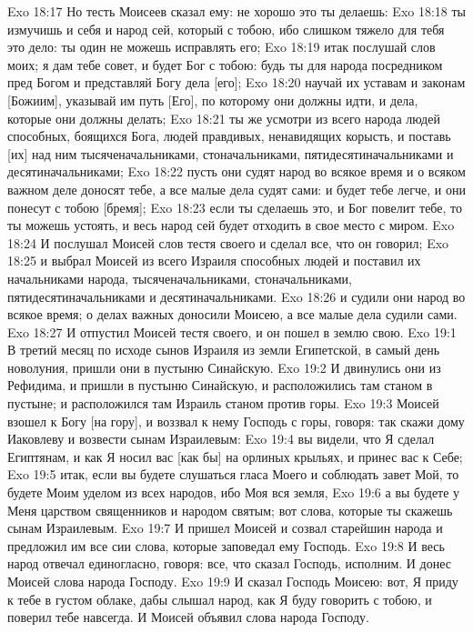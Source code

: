 Exo 18:17  Но тесть Моисеев сказал ему: не хорошо это ты делаешь:
Exo 18:18  ты измучишь и себя и народ сей, который с тобою, ибо слишком тяжело для тебя это дело: ты один не можешь исправлять его;
Exo 18:19  итак послушай слов моих; я дам тебе совет, и будет Бог с тобою: будь ты для народа посредником пред Богом и представляй Богу дела [его];
Exo 18:20  научай их уставам и законам [Божиим], указывай им путь [Его], по которому они должны идти, и дела, которые они должны делать;
Exo 18:21  ты же усмотри из всего народа людей способных, боящихся Бога, людей правдивых, ненавидящих корысть, и поставь [их] над ним тысяченачальниками, стоначальниками, пятидесятиначальниками и десятиначальниками;
Exo 18:22  пусть они судят народ во всякое время и о всяком важном деле доносят тебе, а все малые дела судят сами: и будет тебе легче, и они понесут с тобою [бремя];
Exo 18:23  если ты сделаешь это, и Бог повелит тебе, то ты можешь устоять, и весь народ сей будет отходить в свое место с миром.
Exo 18:24  И послушал Моисей слов тестя своего и сделал все, что он говорил;
Exo 18:25  и выбрал Моисей из всего Израиля способных людей и поставил их начальниками народа, тысяченачальниками, стоначальниками, пятидесятиначальниками и десятиначальниками.
Exo 18:26  и судили они народ во всякое время; о делах важных доносили Моисею, а все малые дела судили сами.
Exo 18:27  И отпустил Моисей тестя своего, и он пошел в землю свою.
Exo 19:1  В третий месяц по исходе сынов Израиля из земли Египетской, в самый день новолуния, пришли они в пустыню Синайскую.
Exo 19:2  И двинулись они из Рефидима, и пришли в пустыню Синайскую, и расположились там станом в пустыне; и расположился там Израиль станом против горы.
Exo 19:3  Моисей взошел к Богу [на гору], и воззвал к нему Господь с горы, говоря: так скажи дому Иаковлеву и возвести сынам Израилевым:
Exo 19:4  вы видели, что Я сделал Египтянам, и как Я носил вас [как бы] на орлиных крыльях, и принес вас к Себе;
Exo 19:5  итак, если вы будете слушаться гласа Моего и соблюдать завет Мой, то будете Моим уделом из всех народов, ибо Моя вся земля,
Exo 19:6  а вы будете у Меня царством священников и народом святым; вот слова, которые ты скажешь сынам Израилевым.
Exo 19:7  И пришел Моисей и созвал старейшин народа и предложил им все сии слова, которые заповедал ему Господь.
Exo 19:8  И весь народ отвечал единогласно, говоря: все, что сказал Господь, исполним. И донес Моисей слова народа Господу.
Exo 19:9  И сказал Господь Моисею: вот, Я приду к тебе в густом облаке, дабы слышал народ, как Я буду говорить с тобою, и поверил тебе навсегда. И Моисей объявил слова народа Господу.
